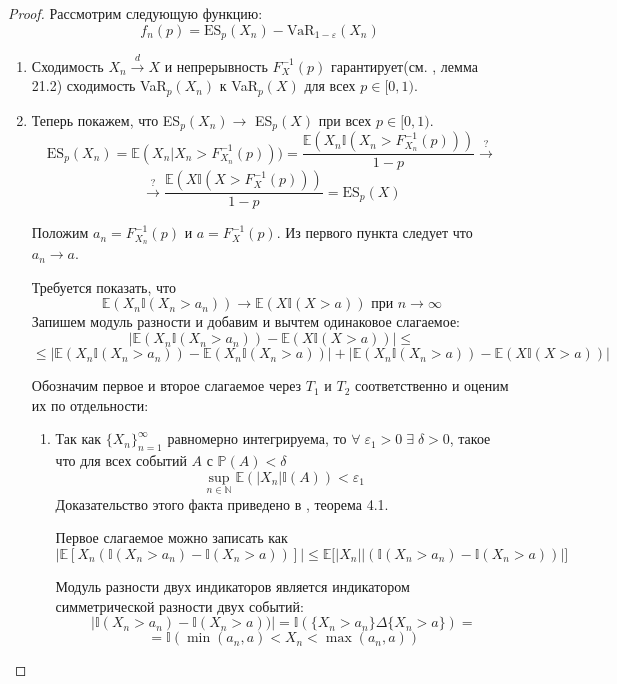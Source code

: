 \documentclass[12pt]{article}
\theoremstyle{plain}
\theoremstyle{definition}
\theoremstyle{remark}
\begin{document}
\begin{proof}
    Рассмотрим следующую функцию:
    \[
        f_n(p)= \text{ES}_p(X_n)- \text{VaR}_{1-\varepsilon}(X_n)
    \]
    \begin{enumerate}
    \item 
    Сходимость $X_n \overset{d}{\to}X$ и непрерывность $F^{-1}_X(p)$ гарантирует(см. \cite{метка6}, лемма 21.2) сходимость VaR$_{p}(X_n)$ к VaR$_{p}(X)$ для всех $p\in [0,1)$.

    \item
    Теперь покажем, что ES$_p(X_n)\to$ ES$_p(X)$ при всех $p \in [0,1)$. 
    \[
        \text{ES}_p(X_n)=\mathbb{E}(X_n|X_n>F^{-1}_{X_n}(p)))= \frac{\mathbb{E}(X_n\mathbb{I}(X_n>F^{-1}_{X_n}(p)))}{1-p}\overset{?}{\to}
    \]
    \[
        \overset{?}{\to}\frac{\mathbb{E}(X\mathbb{I}(X>F^{-1}_{X}(p)))}{1-p}=\text{ES}_p(X)
    \]

    Положим $a_n = F^{-1}_{X_n}(p)$ и $a = F^{-1}_{X}(p)$. Из первого пункта следует что $a_n\to a$.

    Требуется показать, что 
    \[
        \mathbb{E}(X_n\mathbb{I}(X_n>a_n)) \to \mathbb{E}(X\mathbb{I}(X>a)) \text{ при } n\to\infty
    \]
    Запишем модуль разности и добавим и вычтем одинаковое слагаемое:
    \[
        \bigg|\mathbb{E}(X_n\mathbb{I}(X_n>a_n)) - \mathbb{E}(X\mathbb{I}(X>a))\bigg| \leq
    \]
    \[
        \leq \bigg|\mathbb{E}(X_n\mathbb{I}(X_n>a_n)) - \mathbb{E}(X_n\mathbb{I}(X_n>a))\bigg| + \bigg|\mathbb{E}(X_n\mathbb{I}(X_n>a)) - \mathbb{E}(X\mathbb{I}(X>a))\bigg|
    \]
     
    Обозначим первое и второе слагаемое через $T_1$ и $T_2$ соответственно и оценим их по отдельности:
    \begin{enumerate}[label=(\roman*):, font=\textit]
        \item 
        Так как $\{X_n\}_{n=1}^\infty$ равномерно интегрируема, то $\forall\; \varepsilon_1 > 0\; \exists\;\delta > 0$, такое что для всех событий $A$ с $\mathbb{P}(A) < \delta$ 
        \[
        \sup_{n\in \mathbb{N}}\mathbb{E}(|X_n|\mathbb{I}(A)) < \varepsilon_1
        \]
        Доказательство этого факта приведено в \cite{метка7}, теорема 4.1.

        Первое слагаемое можно записать как 
        \[
            \bigg|\mathbb{E}[X_n(\mathbb{I}(X_n>a_n)-\mathbb{I}(X_n>a))]\bigg| \leq \mathbb{E}\bigg[|X_n||(\mathbb{I}(X_n>a_n)-\mathbb{I}(X_n>a))|\bigg]
        \]

        Модуль разности двух индикаторов является индикатором симметрической разности двух событий:
        \[
            \bigg|\mathbb{I}(X_n>a_n)-\mathbb{I}(X_n>a))\bigg|=\mathbb{I}(\{X_n > a_n\} \Delta \{X_n > a\}) = 
        \]
        \[
            = \mathbb{I}(\min{(a_n, a)} < X_n < \max{(a_n, a)})
        \]


\end{enumerate}
\end{enumerate}
\end{proof}
\end{document}

